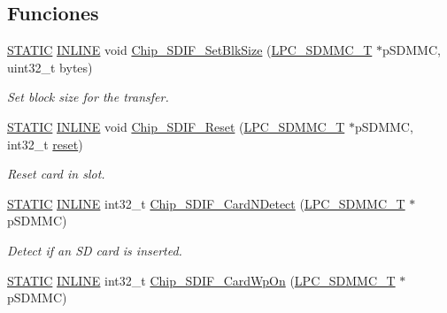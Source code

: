 \subsection*{Funciones}
\begin{DoxyCompactItemize}
\item 
\hyperlink{group___l_p_c___types___public___macros_ga10b2d890d871e1489bb02b7e70d9bdfb}{S\+T\+A\+T\+IC} \hyperlink{spifi__18xx__43xx_8h_a2eb6f9e0395b47b8d5e3eeae4fe0c116}{I\+N\+L\+I\+NE} void \hyperlink{group___s_d_i_f__18_x_x__43_x_x_ga7d88c1bd3f846dfe6375c7797a295795}{Chip\+\_\+\+S\+D\+I\+F\+\_\+\+Set\+Blk\+Size} (\hyperlink{struct_l_p_c___s_d_m_m_c___t}{L\+P\+C\+\_\+\+S\+D\+M\+M\+C\+\_\+T} $\ast$p\+S\+D\+M\+MC, uint32\+\_\+t bytes)
\begin{DoxyCompactList}\small\item\em Set block size for the transfer. \end{DoxyCompactList}\item 
\hyperlink{group___l_p_c___types___public___macros_ga10b2d890d871e1489bb02b7e70d9bdfb}{S\+T\+A\+T\+IC} \hyperlink{spifi__18xx__43xx_8h_a2eb6f9e0395b47b8d5e3eeae4fe0c116}{I\+N\+L\+I\+NE} void \hyperlink{group___s_d_i_f__18_x_x__43_x_x_ga40411a54dae88b2b176c68c44846d709}{Chip\+\_\+\+S\+D\+I\+F\+\_\+\+Reset} (\hyperlink{struct_l_p_c___s_d_m_m_c___t}{L\+P\+C\+\_\+\+S\+D\+M\+M\+C\+\_\+T} $\ast$p\+S\+D\+M\+MC, int32\+\_\+t \hyperlink{enet__18xx__43xx_8c_aeb253604a11400185c3a9933e18c68c3}{reset})
\begin{DoxyCompactList}\small\item\em Reset card in slot. \end{DoxyCompactList}\item 
\hyperlink{group___l_p_c___types___public___macros_ga10b2d890d871e1489bb02b7e70d9bdfb}{S\+T\+A\+T\+IC} \hyperlink{spifi__18xx__43xx_8h_a2eb6f9e0395b47b8d5e3eeae4fe0c116}{I\+N\+L\+I\+NE} int32\+\_\+t \hyperlink{group___s_d_i_f__18_x_x__43_x_x_gaeed25ed66fbdf6d35d351acca47176ba}{Chip\+\_\+\+S\+D\+I\+F\+\_\+\+Card\+N\+Detect} (\hyperlink{struct_l_p_c___s_d_m_m_c___t}{L\+P\+C\+\_\+\+S\+D\+M\+M\+C\+\_\+T} $\ast$p\+S\+D\+M\+MC)
\begin{DoxyCompactList}\small\item\em Detect if an SD card is inserted. \end{DoxyCompactList}\item 
\hyperlink{group___l_p_c___types___public___macros_ga10b2d890d871e1489bb02b7e70d9bdfb}{S\+T\+A\+T\+IC} \hyperlink{spifi__18xx__43xx_8h_a2eb6f9e0395b47b8d5e3eeae4fe0c116}{I\+N\+L\+I\+NE} int32\+\_\+t \hyperlink{group___s_d_i_f__18_x_x__43_x_x_gabe0627da22e658357f0709ec5a354b74}{Chip\+\_\+\+S\+D\+I\+F\+\_\+\+Card\+Wp\+On} (\hyperlink{struct_l_p_c___s_d_m_m_c___t}{L\+P\+C\+\_\+\+S\+D\+M\+M\+C\+\_\+T} $\ast$p\+S\+D\+M\+MC)

\end{DoxyCompactItemize}
